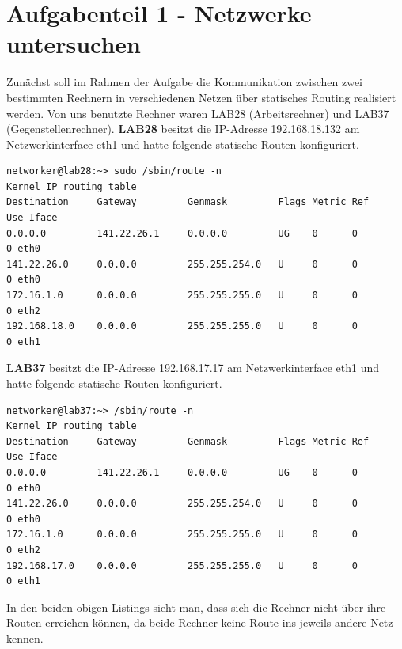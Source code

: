 




\tableofcontents
       
\newpage
\chapter{Aufgabenteil 1 - Netzwerke untersuchen}
Zunächst soll im Rahmen der Aufgabe die Kommunikation zwischen zwei bestimmten Rechnern in verschiedenen Netzen über statisches Routing realisiert werden. Von uns benutzte Rechner waren LAB28 (Arbeitsrechner) und LAB37 (Gegenstellenrechner).
\newline
\newline
\textbf{LAB28} besitzt die IP-Adresse 192.168.18.132 am Netzwerkinterface eth1 und hatte folgende statische Routen konfiguriert.

\begin{lstlisting}[label=lab28,caption=LAB28]
networker@lab28:~> sudo /sbin/route -n
Kernel IP routing table
Destination     Gateway         Genmask         Flags Metric Ref    Use Iface
0.0.0.0         141.22.26.1     0.0.0.0         UG    0      0        0 eth0
141.22.26.0     0.0.0.0         255.255.254.0   U     0      0        0 eth0
172.16.1.0      0.0.0.0         255.255.255.0   U     0      0        0 eth2
192.168.18.0    0.0.0.0         255.255.255.0   U     0      0        0 eth1
\end{lstlisting}
\textbf{LAB37} besitzt die IP-Adresse 192.168.17.17 am Netzwerkinterface eth1 und hatte folgende statische Routen konfiguriert.

\begin{lstlisting}[label=lab37,caption=LAB37]
networker@lab37:~> /sbin/route -n
Kernel IP routing table
Destination     Gateway         Genmask         Flags Metric Ref    Use Iface
0.0.0.0         141.22.26.1     0.0.0.0         UG    0      0        0 eth0
141.22.26.0     0.0.0.0         255.255.254.0   U     0      0        0 eth0
172.16.1.0      0.0.0.0         255.255.255.0   U     0      0        0 eth2
192.168.17.0    0.0.0.0         255.255.255.0   U     0      0        0 eth1
\end{lstlisting}
In den beiden obigen Listings sieht man, dass sich die Rechner nicht über ihre Routen erreichen können, da beide Rechner keine Route ins jeweils andere Netz kennen.
